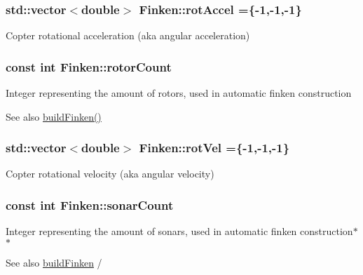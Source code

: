 \subsubsection[{\texorpdfstring{rot\+Accel}{rotAccel}}]{\setlength{\rightskip}{0pt plus 5cm}std\+::vector$<$double$>$ Finken\+::rot\+Accel =\{-\/1,-\/1,-\/1\}}\hypertarget{classFinken_ab1b738a1b691879be240b1b9488f7009}{}\label{classFinken_ab1b738a1b691879be240b1b9488f7009}
Copter rotational acceleration (aka angular acceleration) 
\subsubsection[{\texorpdfstring{rotor\+Count}{rotorCount}}]{\setlength{\rightskip}{0pt plus 5cm}const int Finken\+::rotor\+Count}\hypertarget{classFinken_a2de6be70e0baaf63641df0214bf1f7a2}{}\label{classFinken_a2de6be70e0baaf63641df0214bf1f7a2}
Integer representing the amount of rotors, used in automatic finken construction \begin{DoxySeeAlso}{See also}
\hyperlink{finken_8cpp_ab8920c514423348469521fe0063534c4}{build\+Finken()} 
\end{DoxySeeAlso}
\subsubsection[{\texorpdfstring{rot\+Vel}{rotVel}}]{\setlength{\rightskip}{0pt plus 5cm}std\+::vector$<$double$>$ Finken\+::rot\+Vel =\{-\/1,-\/1,-\/1\}}\hypertarget{classFinken_a518ab8ab8ac8cf54c0b79cbc1ec2075f}{}\label{classFinken_a518ab8ab8ac8cf54c0b79cbc1ec2075f}
Copter rotational velocity (aka angular velocity) 
\subsubsection[{\texorpdfstring{sonar\+Count}{sonarCount}}]{\setlength{\rightskip}{0pt plus 5cm}const int Finken\+::sonar\+Count}\hypertarget{classFinken_a92ae4d32222c44c17a4cea91055569d9}{}\label{classFinken_a92ae4d32222c44c17a4cea91055569d9}
Integer representing the amount of sonars, used in automatic finken construction$\ast$$\ast$ \begin{DoxySeeAlso}{See also}
\hyperlink{finken_8h_ab8920c514423348469521fe0063534c4}{build\+Finken} / 
\end{DoxySeeAlso}
